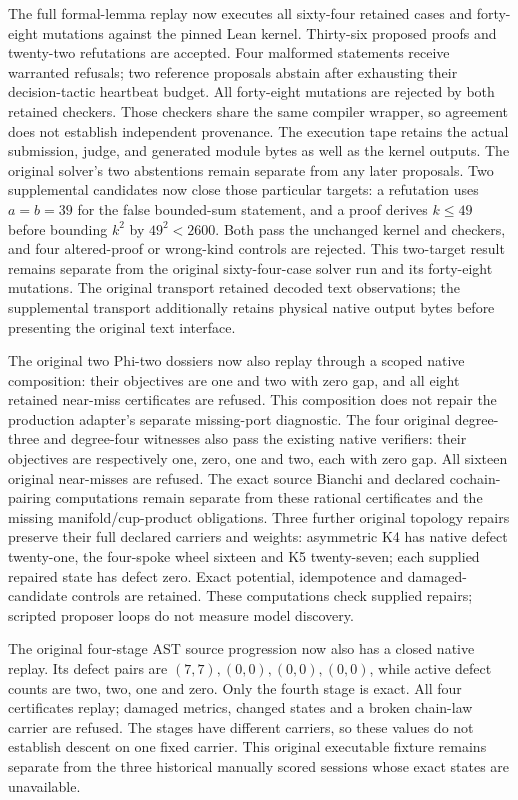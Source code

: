 \documentclass[
  11pt,
]{article}
\begin{document}
The full formal-lemma replay now executes all sixty-four retained cases
and forty-eight mutations against the pinned Lean kernel. Thirty-six
proposed proofs and twenty-two refutations are accepted. Four malformed
statements receive warranted refusals; two reference proposals abstain
after exhausting their decision-tactic heartbeat budget. All forty-eight
mutations are rejected by both retained checkers. Those checkers share
the same compiler wrapper, so agreement does not establish independent
provenance. The execution tape retains the actual submission, judge, and
generated module bytes as well as the kernel outputs. The original
solver's two abstentions remain separate from any later proposals. Two
supplemental candidates now close those particular targets: a refutation
uses \(a=b=39\) for the false bounded-sum statement, and a proof derives
\(k\le49\) before bounding \(k^2\) by \(49^2<2600\). Both pass the
unchanged kernel and checkers, and four altered-proof or wrong-kind
controls are rejected. This two-target result remains separate from the
original sixty-four-case solver run and its forty-eight mutations. The
original transport retained decoded text observations; the supplemental
transport additionally retains physical native output bytes before
presenting the original text interface.

The original two Phi-two dossiers now also replay through a scoped
native composition: their objectives are one and two with zero gap, and
all eight retained near-miss certificates are refused. This composition
does not repair the production adapter's separate missing-port
diagnostic. The four original degree-three and degree-four witnesses
also pass the existing native verifiers: their objectives are
respectively one, zero, one and two, each with zero gap. All sixteen
original near-misses are refused. The exact source Bianchi and declared
cochain-pairing computations remain separate from these rational
certificates and the missing manifold/cup-product obligations. Three
further original topology repairs preserve their full declared carriers
and weights: asymmetric K4 has native defect twenty-one, the four-spoke
wheel sixteen and K5 twenty-seven; each supplied repaired state has
defect zero. Exact potential, idempotence and damaged-candidate controls
are retained. These computations check supplied repairs; scripted
proposer loops do not measure model discovery.

The original four-stage AST source progression now also has a closed
native replay. Its defect pairs are \((7,7),(0,0),(0,0),(0,0)\), while
active defect counts are two, two, one and zero. Only the fourth stage
is exact. All four certificates replay; damaged metrics, changed states
and a broken chain-law carrier are refused. The stages have different
carriers, so these values do not establish descent on one fixed carrier.
This original executable fixture remains separate from the three
historical manually scored sessions whose exact states are unavailable.
\end{document}

